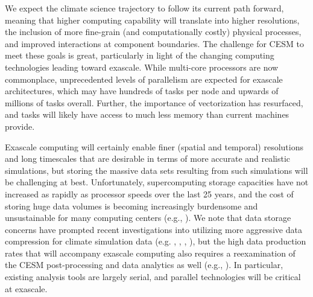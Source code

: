 We expect the climate science trajectory to follow its current path forward, meaning that higher computing capability will translate into higher resolutions, the inclusion of more fine-grain (and computationally costly) physical processes, and improved interactions at component boundaries. The challenge for CESM to meet these goals is great, particularly in light of the changing computing technologies leading toward exascale.  While multi-core processors are now commonplace, unprecedented levels of parallelism are expected for exascale architectures, which may have hundreds of tasks per node and upwards of millions of tasks overall.  Further, the importance of vectorization has resurfaced, and tasks will likely have access to much less memory than current machines provide.

Exascale computing will certainly enable finer (spatial and temporal) resolutions and long timescales that are desirable in terms of more accurate and realistic simulations, but storing the massive data sets resulting from such simulations will be challenging at best. Unfortunately, supercomputing storage capacities have not increased as rapidly as processor speeds over the last 25 years, and the cost of storing huge data volumes is becoming increasingly burdensome and unsustainable for many computing centers (e.g., \cite{kunkel2014}).  We note that data storage concerns have prompted recent investigations into utilizing more aggressive data compression for climate simulation data (e.g. \cite{baker2014}, \cite{baker2016-pepsi}, \cite{woodring11}, \cite{hubbe12}), but the high data production rates that will accompany exascale computing also requires a reexamination of the CESM post-processing and data analytics as well (e.g., \cite{paul2015}).  In particular, existing analysis tools are largely serial, and parallel technologies will be critical at exascale. 


